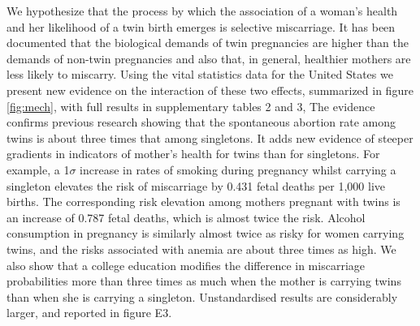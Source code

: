 \documentclass{nature}
\begin{document}
\begin{linenumbers}
We hypothesize that the process by which the association of a woman's health and her likelihood of a twin birth emerges is selective miscarriage. It has been documented that the biological demands of twin pregnancies are higher than the demands of non-twin pregnancies\cite{Shinagawaetal2005,Kahnetal2003} and also that, in general, healthier mothers are less likely to miscarry\cite{Frettsetal1995,Garciaetal2002}. Using the vital statistics data for the United States we present new evidence on the interaction of these two effects, summarized in figure \ref{fig:mech}, with full results in supplementary tables 2 and 3, %
The evidence confirms previous research showing that the spontaneous abortion rate among twins is about three times that among singletons\cite{Boklage1990}. It adds new evidence of steeper gradients in indicators of mother's health for twins than for singletons. For example, a 1$\sigma$ increase in rates of smoking during pregnancy whilst carrying a singleton elevates the risk of miscarriage by 0.431 fetal deaths per 1,000 live births.
The corresponding risk elevation among mothers pregnant with twins is an increase of 0.787 fetal deaths, which is almost twice the risk.
Alcohol consumption in pregnancy is similarly almost twice as risky for women carrying twins, and the risks associated with anemia are about three times as high. We also show that a college education modifies the difference in miscarriage probabilities more than three times as much when the mother is carrying twins than when she is carrying a singleton.  Unstandardised results are considerably larger, and reported in figure E3.



\end{linenumbers}
\end{document}
